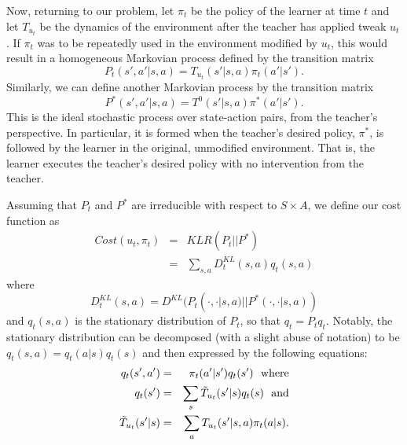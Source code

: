 Now, returning to our problem, let $\pi_t$ be the policy of the
learner at time $t$ and let $T_{u_t}$ be the dynamics of the
environment after the teacher has applied tweak $u_t$. If $\pi_t$ was
to be repeatedly used in the environment modified by $u_t$, this would
result in a homogeneous Markovian process defined by the transition
matrix
\[
P_t(s',a'|s,a)=T_{u_t}(s'|s,a)\pi_t(a'|s').
\]
Similarly, we can define another  Markovian process by the transition matrix
\[
P^*(s',a'|s,a)=T^0(s'|s,a)\pi^*(a'|s').
\]
This is the ideal stochastic process over state-action pairs, from the
teacher's perspective. In particular, it is formed when the teacher's
desired policy, $\pi^*$, is followed by the learner in the original,
unmodified environment. That is, the learner executes the teacher's
desired policy with no intervention from the teacher.

Assuming that $P_t$ and $P^*$ are irreducible with respect to $S\times
A$, we define our cost function as
\begin{eqnarray*}
Cost(u_t,\pi_t) & =& KLR(P_t||P^*) \\
                           &=& \sum_{s,a}D^{KL}_t(s,a)q_t(s,a)
\end{eqnarray*}
where
\[
D_t^{KL}(s,a)=D^{KL}(P_t(\cdot,\cdot|s,a)||P^*(\cdot,\cdot|s,a))
\]
and $q_t(s,a)$ is the  stationary distribution of $P_t$, so that
$q_t=P_tq_t$. 
Notably, the
stationary distribution can be decomposed (with a slight abuse of
notation) to be $q_t(s,a)=q_t(a|s)q_t(s)$ and then expressed by the
following equations:
\begin{eqnarray*}
q_t(s',a')&=&\pi_t(a'|s')q_t(s')\ \ \mbox{where}\\
q_t(s')&=&\sum\limits_s\Tilde{T}_{u_t}(s'|s)q_t(s) \ \ \mbox{and}\\
\Tilde{T}_{u_t}(s'|s)&=&\sum_{a}T_{u_t}(s'|s,a)\pi_t(a|s).
\end{eqnarray*}




